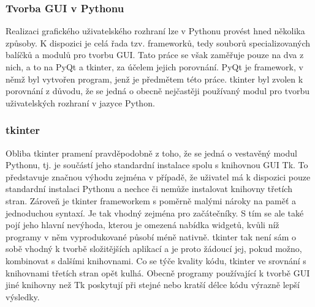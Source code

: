 \documentclass[a4paper, 12pt]{article}
\begin{document}
\subsubsection{Tvorba GUI v Pythonu}
 Realizaci grafického uživatelského rozhraní lze v Pythonu provést hned několika způsoby. K dispozici je celá řada tzv. frameworků, tedy souborů specializovaných balíčků a modulů pro tvorbu GUI. Tato práce se však zaměřuje pouze na dva z nich, a to na PyQt a tkinter, za účelem jejich porovnání. PyQt je framework, v němž byl vytvořen program, jenž je předmětem této práce. tkinter byl zvolen k porovnání z důvodu, že se jedná o obecně nejčastěji používaný modul pro tvorbu uživatelských rozhraní v jazyce Python.
\subsubsection*{tkinter}
Obliba tkinter pramení pravděpodobně z toho, že se jedná o vestavěný modul Pythonu, tj. je součástí jeho standardní instalace spolu s knihovnou GUI Tk. To představuje značnou výhodu zejména v případě, že uživatel má k dispozici pouze standardní instalaci Pythonu a nechce či nemůže instalovat knihovny třetích stran. \cite{Python3Summerfield:2} Zároveň je tkinter frameworkem s poměrně malými nároky na paměť a jednoduchou syntaxí. Je tak vhodný zejména pro začátečníky. S tím se ale také pojí jeho hlavní nevýhoda, kterou je omezená nabídka widgetů, kvůli níž programy v něm vyprodukované působí méně nativně. tkinter tak není sám o sobě vhodný k tvorbě složitějších aplikací a je proto žádoucí jej, pokud možno, kombinovat s dalšími knihovnami. Co se týče kvality kódu, tkinter ve srovnání s knihovnami třetích stran opět kulhá. Obecně programy používající k tvorbě GUI jiné knihovny než Tk poskytují při stejné nebo kratší délce kódu výrazně lepší výsledky. \cite{Python3Summerfield:2}  
\end{document}
